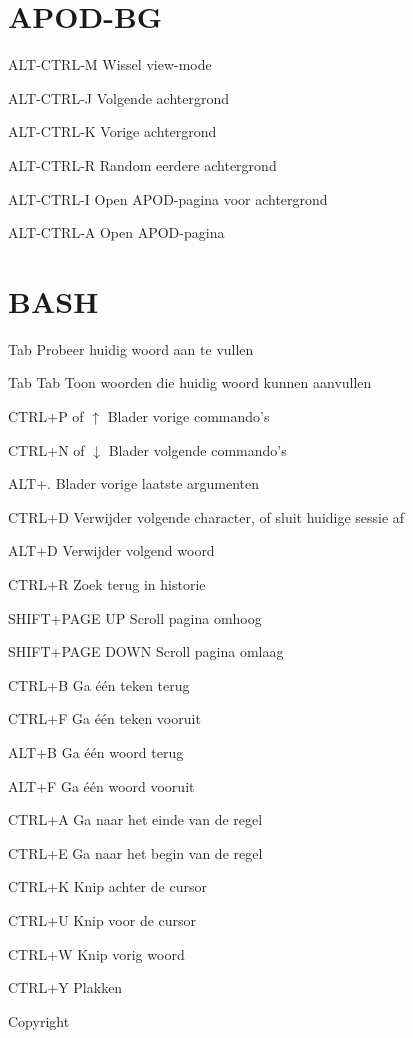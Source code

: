 \documentclass[10pt]{article}
\begin{document}
\begin{multicols}{3}
	\section{APOD-BG}
	\begin{ttdesc}[labelwidth=\widthof{\texttt{WIN-SHIFT+E}}]
	\item[ALT-CTRL-M] Wissel view-mode
	\item[ALT-CTRL-J] Volgende achtergrond
	\item[ALT-CTRL-K] Vorige achtergrond
	\item[ALT-CTRL-R] Random eerdere achtergrond
	\item[ALT-CTRL-I] Open APOD-pagina voor achtergrond
	\item[ALT-CTRL-A] Open APOD-pagina
	\end{ttdesc}

	\section{BASH}
	\begin{ttdesc}[labelwidth=\widthof{\texttt{Tab Tab}}]
	\item[Tab] Probeer huidig woord aan te vullen
	\item[Tab Tab] Toon woorden die huidig woord kunnen aanvullen
	\item[CTRL+P of $\uparrow$] Blader vorige commando's
	\item[CTRL+N of $\downarrow$] Blader volgende commando's
	\item[ALT+.] Blader vorige laatste argumenten
	\item[CTRL+D] Verwijder volgende character, of sluit huidige sessie af
	\item[ALT+D] Verwijder volgend woord
	\item[CTRL+R] Zoek terug in historie
	\item[SHIFT+PAGE UP] Scroll pagina omhoog
	\item[SHIFT+PAGE DOWN] Scroll pagina omlaag
	\item[CTRL+B] Ga \'{e}\'{e}n teken terug
	\item[CTRL+F] Ga \'{e}\'{e}n teken vooruit
	\item[ALT+B] Ga \'{e}\'{e}n woord terug
	\item[ALT+F] Ga \'{e}\'{e}n woord vooruit
	\item[CTRL+A] Ga naar het einde van de regel
	\item[CTRL+E] Ga naar het begin van de regel
	\item[CTRL+K] Knip achter de cursor 
	\item[CTRL+U] Knip voor de cursor 
	\item[CTRL+W] Knip vorig woord 
	\item[CTRL+Y] Plakken 
	\end{ttdesc}


	\noindent Copyright \textcopyright{} \thedate{} \theauthor{}

\end{multicols}
\end{document}
